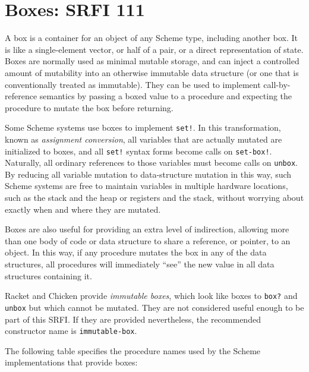\section{Boxes: SRFI 111}

A box is a container for an object of any Scheme type, including another
box. It is like a single-element vector, or half of a pair, or a direct
representation of state. Boxes are normally used as minimal mutable
storage, and can inject a controlled amount of mutability into an
otherwise immutable data structure (or one that is conventionally
treated as immutable). They can be used to implement call-by-reference
semantics by passing a boxed value to a procedure and expecting the
procedure to mutate the box before returning.

Some Scheme systems use boxes to implement \texttt{set!}. In this
transformation, known as \emph{assignment conversion}, all variables
that are actually mutated are initialized to boxes, and all
\texttt{set!} syntax forms become calls on \texttt{set-box!}. Naturally,
all ordinary references to those variables must become calls on
\texttt{unbox}. By reducing all variable mutation to data-structure
mutation in this way, such Scheme systems are free to maintain variables
in multiple hardware locations, such as the stack and the heap or
registers and the stack, without worrying about exactly when and where
they are mutated.

Boxes are also useful for providing an extra level of indirection,
allowing more than one body of code or data structure to share a
reference, or pointer, to an object. In this way, if any procedure
mutates the box in any of the data structures, all procedures will
immediately ``see'' the new value in all data structures containing it.

Racket and Chicken provide \emph{immutable boxes}, which look like boxes
to \texttt{box?} and \texttt{unbox} but which cannot be mutated. They
are not considered useful enough to be part of this SRFI. If they are
provided nevertheless, the recommended constructor name is
\texttt{immutable-box}.

The following table specifies the procedure names used by the Scheme
implementations that provide boxes:

